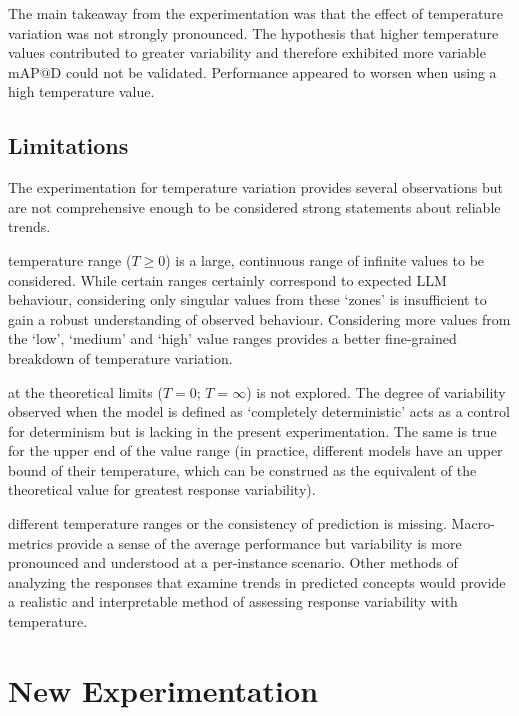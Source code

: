\documentclass[a4paper,colorinlistoftodos]{article}
\begin{document}
The main takeaway from the experimentation was that the effect of temperature
variation was not strongly pronounced. The hypothesis that higher temperature
values contributed to greater variability and therefore exhibited more
variable $\text{mAP@D}$ could not be validated. Performance appeared to worsen
when using a high temperature value.

\subsection{Limitations}
\label{subsec:temp-variation-prev-limitations}

The experimentation for temperature variation provides several observations
but are not comprehensive enough to be considered strong statements about
reliable trends.

temperature range ($T \geq 0$) is a large, continuous range of infinite values
to be considered. While certain ranges certainly correspond to expected LLM
behaviour, considering only singular values from these `zones' is insufficient
to gain a robust understanding of observed behaviour. Considering more values
from the `low', `medium' and `high' value ranges provides a better
fine-grained breakdown of temperature variation.

at the theoretical limits ($T=0$; $T=\infty$) is not explored. The degree of
variability observed when the model is defined as `completely deterministic'
acts as a control for determinism but is lacking in the present
experimentation. The same is true for the upper end of the value range (in
practice, different models have an upper bound of their temperature, which can
be construed as the equivalent of the theoretical value for greatest response
variability).

different temperature ranges or the consistency of prediction is
missing. Macro-metrics provide a sense of the average performance but
variability is more pronounced and understood at a per-instance
scenario. Other methods of analyzing the responses that examine trends in
predicted concepts would provide a realistic and interpretable method of
assessing response variability with temperature.

\section{New Experimentation}
\label{sec:new-temp-variation}
\end{document}
